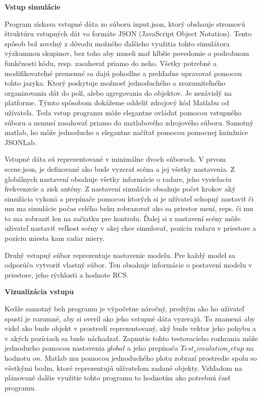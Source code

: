     \textbf{Vstup simulácie}

    Program získava vstupné dáta zo súboru input.json, ktorý obshauje stromovú štruktúru vstupných dát vo formáte JSON (JavaScript Object Notation).
    Tento spôsob bol zovelný z dôvodu možného ďalšieho využitia tohto simulátora výzkumnou skupinov, bez toho aby museli mať hlbšie povedomie o podrobnom funkčnosti kódu, resp. zasahovať priamo do neho.
    Všetky potrebné a modifikovateľné premenné sa dajú pohodlne a prehľadne upravovať pomocou tohto jazyka. Ktorý poskytuje možnosť jednoduchého a zrozumiteľného organizovania dát do polí, alebo agregovania do objektov. Je nezávislý na platforme.
    Týmto spôsobom dokážeme oddeliť zdrojový kód Matlabu od užívateľa. Teda vstup programu môže elegantne ovládať pomocou vstupného súboru a nemusí zasahovať priamo do matlabového zdrojového súboru.
    Samotný matlab, ho môže jednoducho a elegantne načítať pomocou pomocnej kninžnice JSONLab.

    Vstupné dáta sú reprezentované v minimálne dvoch súboroch. V prvom scene.json, je definované ako bude vyzerať scéna a jej všetky nastavenia. Z globálnych nastavení obsahuje všetky informácie o radare, jeho vysielaciu frekvenzcie a zisk antény. Z nastavení simulácie obsahuje počet krokov aký simulácia vykoná a prepínače pomocou ktorých si je užívateľ schopný nastaviť či mu ma simulácie počas celého behu zobrazovať ako sa priestor mení, reps. či mu to ma zobraziť len na začiatku pre kontrolu. 
    Ďalej si z nastavení scény môže uživateľ nastaviť veľkost scény v akej chce simulovať, pozíciu radaru v priestore a pozíciu miesta kam radar miery.

    Druhý vstupný súbor reprezentuje nastavenie modelu. Pre každý model sa odporúča vytvoriť vlastný súbor. Ten obsahuje informácie o postavení modelu v priestore, jeho rýchlosti a hodnote RCS.\newline

    \textbf{Vizualizácia vstupu}

    Kedže samotný beh programu je výpočetne náročný, predtým ako ho užívateľ spustí je rozumné, aby si overil ako jeho vstupné dáta vyzerajú. To znamená aby videl ako bude objekt v prostredí reprezentovaný, aký bude vektor jeho pohybu a v akých pozíciach sa bude náchadzať. Zapnutie tohto testovacieho rozhrania môže jednoducho pomocou nastavenia $global$ a jeho prepínača $Test_simulation_setup$ na hodnotu $on$.
    Matlab mu pomocou jednoduchého plotu zobrazí prostredie spolu so všetkými bodm, ktoré reprezentujú užívateľom zadané objekty.
    Vzhľadom na plánované dalšie využitie tohto programu to hodnotím ako potrebnú časť programu.\newline

